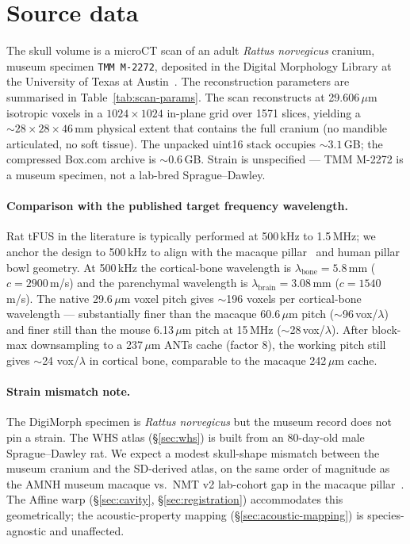 \documentclass{compactarticle}
\begin{document}
\section{Source data}
\label{sec:source}

The skull volume is a microCT scan of an adult \emph{Rattus norvegicus}
cranium, museum specimen \texttt{TMM M-2272}, deposited in the Digital
Morphology Library at the University of Texas at
Austin~\cite{digimorph-rat}. The reconstruction parameters are
summarised in Table~\ref{tab:scan-params}. The scan reconstructs at
29.606\,$\mu$m isotropic voxels in a $1024 \times 1024$ in-plane grid
over 1571 slices, yielding a ${\sim}28 \times 28 \times 46$\,mm
physical extent that contains the full cranium (no mandible
articulated, no soft tissue). The unpacked uint16 stack occupies
${\sim}3.1$\,GB; the compressed Box.com archive is ${\sim}0.6$\,GB.
Strain is unspecified --- TMM M-2272 is a museum specimen, not a
lab-bred Sprague--Dawley.

\begin{table}[H]
\centering
\caption{DigiMorph TMM M-2272 scan parameters (from specimen page).}
\label{tab:scan-params}
\small

\end{table}

\paragraph{Comparison with the published target frequency wavelength.}
Rat tFUS in the literature is typically performed at 500\,kHz to
1.5\,MHz; we anchor the design to 500\,kHz to align with the macaque
pillar~\cite{tuba-macaque} and human pillar~\cite{tuba-human} bowl
geometry. At 500\,kHz the cortical-bone wavelength is
$\lambda_{\mathrm{bone}} = 5.8$\,mm ($c = 2900$\,m/s) and the
parenchymal wavelength is $\lambda_{\mathrm{brain}} = 3.08$\,mm
($c = 1540$\,m/s). The native 29.6\,$\mu$m voxel pitch gives
$\sim$196 voxels per cortical-bone wavelength --- substantially
finer than the macaque 60.6\,$\mu$m pitch ($\sim$96\,vox/$\lambda$)
and finer still than the mouse 6.13\,$\mu$m pitch at 15\,MHz
($\sim$28\,vox/$\lambda$). After block-max downsampling to a
237\,$\mu$m ANTs cache (factor 8), the working pitch still gives
$\sim$24 vox/$\lambda$ in cortical bone, comparable to the macaque
242\,$\mu$m cache.

\paragraph{Strain mismatch note.}
The DigiMorph specimen is \emph{Rattus norvegicus} but the museum
record does not pin a strain. The WHS atlas (\S\ref{sec:whs}) is
built from an 80-day-old male Sprague--Dawley rat. We expect a
modest skull-shape mismatch between the museum cranium and the
SD-derived atlas, on the same order of magnitude as the AMNH
museum macaque vs.\ NMT v2 lab-cohort gap in the macaque
pillar~\cite{tuba-macaque}. The Affine warp
(\S\ref{sec:cavity}, \S\ref{sec:registration}) accommodates this
geometrically; the acoustic-property mapping
(\S\ref{sec:acoustic-mapping}) is species-agnostic and unaffected.
\end{document}
